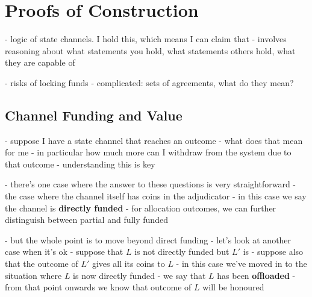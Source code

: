 \section{Proofs of Construction}\label{sec:reasoning}

- logic of state channels. I hold this, which means I can claim that
- involves reasoning about what statements you hold, what statements others hold, what they are capable of

- risks of locking funds
- complicated: sets of agreements, what do they mean?

\subsection{Channel Funding and Value}

- suppose I have a state channel that reaches an outcome
- what does that mean for me
- in particular how much more can I withdraw from the system due to that outcome
- understanding this is key

\begin{figure}[h]\centering
  \makebox[\textwidth][c]{}
  \caption{
  }\label{fig:meaning-of-funding}
\end{figure}

- there's one case where the answer to these questions is very straightforward
- the case where the channel itself has coins in the adjudicator
- in this case we say the channel is \textbf{directly funded}
- for allocation outcomes, we can further distinguish between partial and fully funded
\begin{figure}[h]\centering
  \makebox[\textwidth][c]{}
  \caption{
  }\label{fig:direct-funding}
\end{figure}

- but the whole point is to move beyond direct funding
- let's look at another case when it's ok
- suppose that $L$ is not directly funded but $L'$ is
- suppose also that the outcome of $L'$ gives all its coins to $L$
- in this case we've moved in to the situation where $L$ is now directly funded
- we say that $L$ has been \textbf{offloaded}
- from that point onwards we know that outcome of $L$ will be honoured

\begin{figure}[h]\centering
  \makebox[\textwidth][c]{}
  \caption{
  }\label{fig:indirect-funding}
\end{figure}

